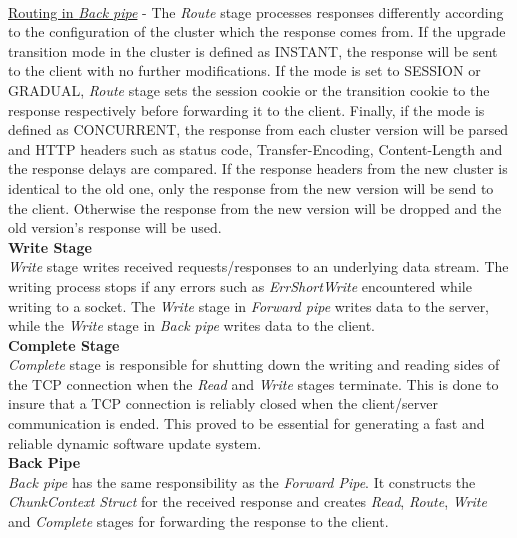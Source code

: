 \documentclass[a4paper,11pt,twoside]{article}
\begin{document}
\noindent\\
\underline{Routing in \textit{Back pipe}} - The \textit{Route} stage processes responses differently according to the configuration of the cluster which the response comes from. If the upgrade transition mode in the cluster is defined as INSTANT, the response will be sent to the client with no further modifications. If the mode is set to SESSION or GRADUAL, \textit{Route} stage sets the session cookie or the transition cookie to the response respectively before forwarding it to the client. Finally, if the mode is defined as CONCURRENT, the response from each cluster version will be parsed and HTTP headers such as status code, Transfer-Encoding, Content-Length and the response delays are compared. If the response headers from the new cluster is identical to the old one, only the response from the new version will be send to the client. Otherwise the response from the new version will be dropped and the old version's response will be used.\\

\noindent
\textbf{Write Stage} \\
\textit{Write} stage writes received requests/responses to an underlying data stream. The writing process stops if any errors such as \textit{ErrShortWrite} encountered while writing to a socket. The \textit{Write} stage in \textit{Forward pipe} writes data to the server, while the \textit{Write} stage in \textit{Back pipe} writes data to the client.   \\

\noindent
\textbf{Complete Stage}\\ 
\textit{Complete} stage is responsible for shutting down the writing and reading sides of the TCP connection when the \textit{Read} and \textit{Write} stages terminate. This is done to insure that a TCP connection is reliably closed when the client/server communication is ended. This proved to be essential for generating a fast and reliable dynamic software update system.\\ 

\noindent
\textbf{Back Pipe}\\
\textit{Back pipe} has the same responsibility as the \textit{Forward Pipe}. It constructs the \textit{ChunkContext Struct} for the received response and creates \textit{Read}, \textit{Route}, \textit{Write} and \textit{Complete} stages for forwarding the response to the client.\\\\
\end{document}
